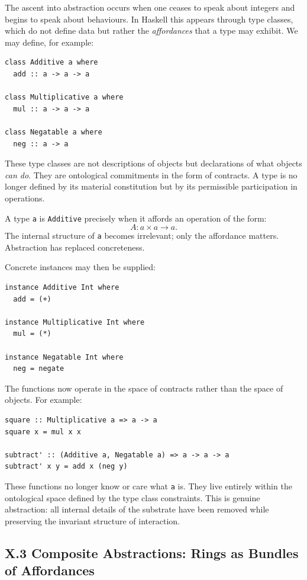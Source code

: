 \documentclass[12pt,letterpaper]{article}
\theoremstyle{remark}
\begin{document}
The ascent into abstraction occurs when one ceases to speak about integers and begins to speak about behaviours. In Haskell this appears through type classes, which do not define data but rather the \emph{affordances} that a type may exhibit. We may define, for example:

\begin{verbatim}
class Additive a where
  add :: a -> a -> a

class Multiplicative a where
  mul :: a -> a -> a

class Negatable a where
  neg :: a -> a
\end{verbatim}

These type classes are not descriptions of objects but declarations of what objects \emph{can do}. They are ontological commitments in the form of contracts. A type is no longer defined by its material constitution but by its permissible participation in operations.

A type \texttt{a} is \texttt{Additive} precisely when it affords an operation of the form:
\[
A : a \times a \to a.
\]
The internal structure of \texttt{a} becomes irrelevant; only the affordance matters. Abstraction has replaced concreteness.

Concrete instances may then be supplied:

\begin{verbatim}
instance Additive Int where
  add = (+)

instance Multiplicative Int where
  mul = (*)

instance Negatable Int where
  neg = negate
\end{verbatim}

The functions now operate in the space of contracts rather than the space of objects. For example:

\begin{verbatim}
square :: Multiplicative a => a -> a
square x = mul x x

subtract' :: (Additive a, Negatable a) => a -> a -> a
subtract' x y = add x (neg y)
\end{verbatim}

These functions no longer know or care what \texttt{a} is. They live entirely within the ontological space defined by the type class constraints. This is genuine abstraction: all internal details of the substrate have been removed while preserving the invariant structure of interaction.

\subsection{X.3 Composite Abstractions: Rings as Bundles of Affordances}
\end{document}
